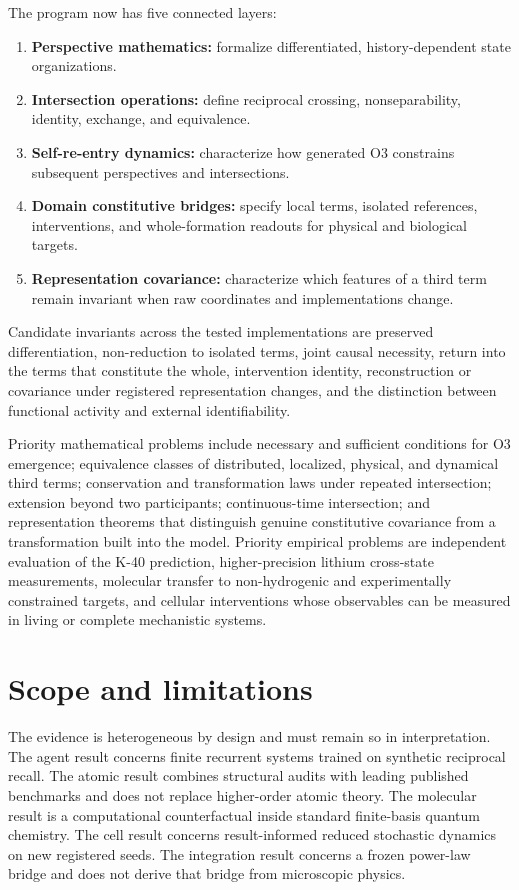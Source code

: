 \documentclass[11pt,a4paper]{article}
\begin{document}
The program now has five connected layers:
\begin{enumerate}
  \item \textbf{Perspective mathematics:} formalize differentiated, history-dependent state organizations.
  \item \textbf{Intersection operations:} define reciprocal crossing, nonseparability, identity, exchange, and equivalence.
  \item \textbf{Self-re-entry dynamics:} characterize how generated O3 constrains subsequent perspectives and intersections.
  \item \textbf{Domain constitutive bridges:} specify local terms, isolated references, interventions, and whole-formation readouts for physical and biological targets.
  \item \textbf{Representation covariance:} characterize which features of a third term remain invariant when raw coordinates and implementations change.
\end{enumerate}

Candidate invariants across the tested implementations are preserved differentiation, non-reduction to isolated terms, joint causal necessity, return into the terms that constitute the whole, intervention identity, reconstruction or covariance under registered representation changes, and the distinction between functional activity and external identifiability.

Priority mathematical problems include necessary and sufficient conditions for O3 emergence; equivalence classes of distributed, localized, physical, and dynamical third terms; conservation and transformation laws under repeated intersection; extension beyond two participants; continuous-time intersection; and representation theorems that distinguish genuine constitutive covariance from a transformation built into the model. Priority empirical problems are independent evaluation of the K-40 prediction, higher-precision lithium cross-state measurements, molecular transfer to non-hydrogenic and experimentally constrained targets, and cellular interventions whose observables can be measured in living or complete mechanistic systems.

\section{Scope and limitations}

The evidence is heterogeneous by design and must remain so in interpretation. The agent result concerns finite recurrent systems trained on synthetic reciprocal recall. The atomic result combines structural audits with leading published benchmarks and does not replace higher-order atomic theory. The molecular result is a computational counterfactual inside standard finite-basis quantum chemistry. The cell result concerns result-informed reduced stochastic dynamics on new registered seeds. The integration result concerns a frozen power-law bridge and does not derive that bridge from microscopic physics.
\end{document}
